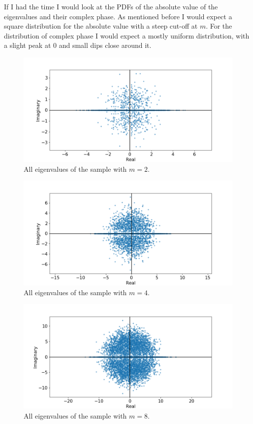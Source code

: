 \documentclass[a4paper, 11pt]{article}
\begin{document}
If I had the time I would look at the PDFs of the absolute value of the
eigenvalues and their complex phase. As mentioned before I would expect a
square distribution for the absolute value with a steep cut-off at $m$. For the
distribution of complex phase I would expect a mostly uniform distribution,
with a slight peak at 0 and small dips close around it.

\begin{figure}
  \centering
  \includegraphics[width=\textwidth]{../2/square_evs/2.png}
  \caption{All eigenvalues of the sample with $m=2$.}
  \label{fig:evs_2}
\end{figure}
\begin{figure}
  \centering
  \includegraphics[width=\textwidth]{../2/square_evs/4.png}
  \caption{All eigenvalues of the sample with $m=4$.}
  \label{fig:evs_4}
\end{figure}
\begin{figure}
  \centering
  \includegraphics[width=\textwidth]{../2/square_evs/8.png}
  \caption{All eigenvalues of the sample with $m=8$.}
  \label{fig:evs_8}
\end{figure}
\end{document}

